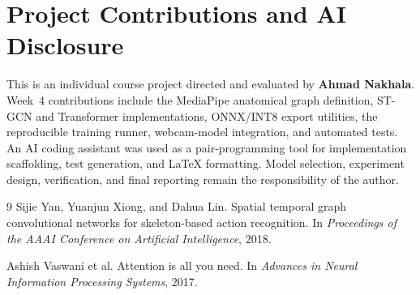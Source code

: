 \documentclass{article}
\begin{document}
\section*{Project Contributions and AI Disclosure}
This is an individual course project directed and evaluated by \textbf{Ahmad Nakhala}. Week~4 contributions include the MediaPipe anatomical graph definition, ST-GCN and Transformer implementations, ONNX/INT8 export utilities, the reproducible training runner, webcam-model integration, and automated tests. An AI coding assistant was used as a pair-programming tool for implementation scaffolding, test generation, and LaTeX formatting. Model selection, experiment design, verification, and final reporting remain the responsibility of the author.

\begin{thebibliography}{9}
Sijie Yan, Yuanjun Xiong, and Dahua Lin.
\newblock Spatial temporal graph convolutional networks for skeleton-based action recognition.
\newblock In \emph{Proceedings of the AAAI Conference on Artificial Intelligence}, 2018.

Ashish Vaswani et al.
\newblock Attention is all you need.
\newblock In \emph{Advances in Neural Information Processing Systems}, 2017.
\end{thebibliography}
\end{document}
